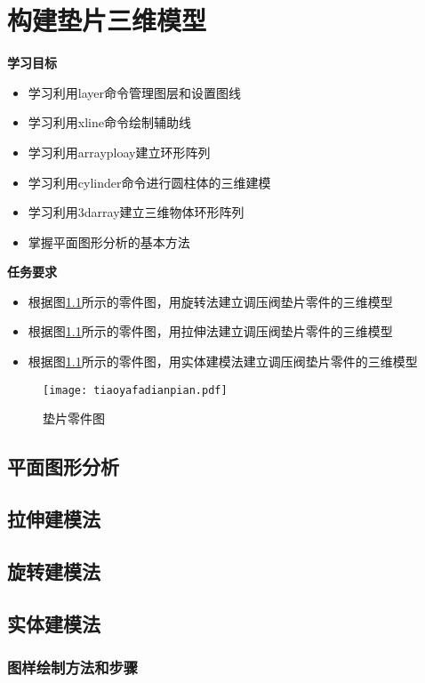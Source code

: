 \chapter{构建垫片三维模型}\label{chap:dianpian}

{\bfseries 学习目标}
\begin{itemize}
\item 学习利用layer命令管理图层和设置图线
\item 学习利用xline命令绘制辅助线
\item 学习利用arrayploay建立环形阵列
\item 学习利用cylinder命令进行圆柱体的三维建模
\item 学习利用3darray建立三维物体环形阵列
\item 掌握平面图形分析的基本方法
\end{itemize}

{\bfseries 任务要求}
\begin{itemize}
\item 根据图\ref{fig:tiaoyafadianpian}所示的零件图，用旋转法建立调压阀垫片零件的三维模型
\item 根据图\ref{fig:tiaoyafadianpian}所示的零件图，用拉伸法建立调压阀垫片零件的三维模型
\item 根据图\ref{fig:tiaoyafadianpian}所示的零件图，用实体建模法建立调压阀垫片零件的三维模型
\end{itemize}

\noindent
\begin{figure}[htbp]
\centering
\texttt{[image: tiaoyafadianpian.pdf]}
\caption{垫片零件图}\label{fig:tiaoyafadianpian}
\end{figure}
\clearpage
\section{平面图形分析}


\section{拉伸建模法}


\section{旋转建模法}


\section{实体建模法}

\subsection{图样绘制方法和步骤}

\endinput